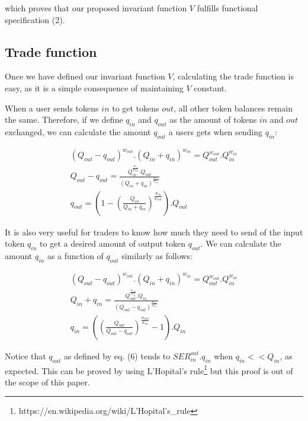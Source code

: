 \documentclass[11pt]{amsart}
\begin{document}
which proves that our proposed invariant function $V$ fulfills functional specification (2).

\subsection{Trade function}

Once we have defined our invariant function $V$, calculating the trade function is easy, as it is a simple consequence of maintaining $V$ constant.

When a user sends tokens $in$ to get tokens $out$, all other token balances remain the same. Therefore, if we define $q_{in}$ and $q_{out}$ as the amount of tokens $in$ and $out$ exchanged, we can calculate the amount $q_{out}$ a users gets when sending $q_{in}$:

\begin{equation}
\begin{gathered}
(Q_{out}-q_{out})^{w_{out}}.(Q_{in}+q_{in})^{w_{in}} = Q_{out}^{w_{out}}.Q_{in}^{w_{in}} \\
Q_{out}-q_{out} = \frac{Q_{in}^{\frac{w_{in}}{w_{out}}}.Q_{out}}{(Q_{in}+q_{in})^{\frac{w_{in}}{w_{out}}}}\\
q_{out} = \left(1 - \left(\frac{Q_{in}}{Q_{in}+q_{in}}\right)^{\frac{w_{in}}{w_{out}}}\right).Q_{out}
\end{gathered}
\end{equation}

It is also very useful for traders to know how much they need to send of the input token $q_{in}$ to get a desired amount of output token $q_{out}$. We can calculate the amount $q_{in}$ as a function of $q_{out}$ similarly as follows:

\begin{equation}
\begin{gathered}
(Q_{out}-q_{out})^{w_{out}}.(Q_{in}+q_{in})^{w_{in}} = Q_{out}^{w_{out}}.Q_{in}^{w_{in}} \\
Q_{in}+q_{in} = \frac{Q_{out}^{\frac{w_{out}}{w_{in}}}.Q_{in}}{(Q_{out}-q_{out})^{\frac{w_{out}}{w_{in}}}}\\
q_{in} = \left(\left(\frac{Q_{out}}{Q_{out}-q_{out}}\right)^{\frac{w_{out}}{w_{in}}}-1\right).Q_{in}
\end{gathered}
\end{equation}

Notice that $q_{out}$ as defined by eq. (6) tends to $SER^{out}_{in}.q_{in}$ when $q_{in} << Q_{in}$, as expected. This can be proved by using L'Hopital's rule\footnote{https://en.wikipedia.org/wiki/L'Hopital's\_rule} but this proof is out of the scope of this paper.
\end{document}

